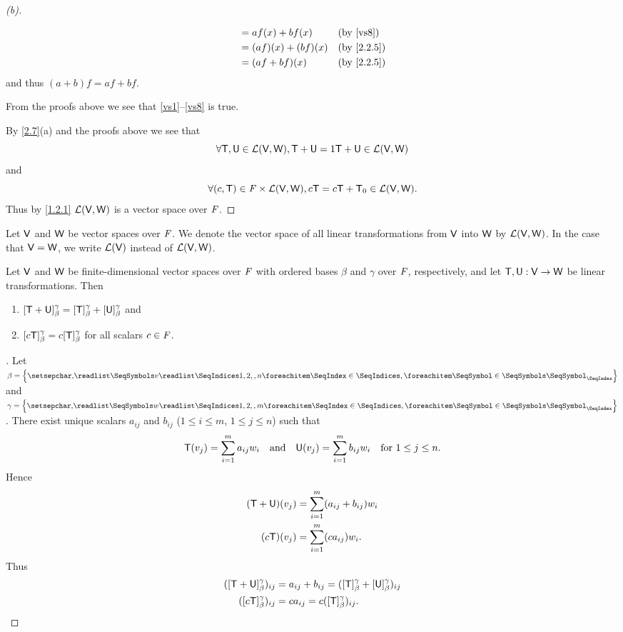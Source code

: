 \begin{proof}[(b)]
\begin{description}
\begin{align*}
                                        & = af(x) + bf(x)     &  & \text{(by \ref{vs8})}    \\
                                        & = (af)(x) + (bf)(x) &  & \text{(by \cref{2.2.5})} \\
                                        & = (af + bf)(x)      &  & \text{(by \cref{2.2.5})}
      \end{align*}
      and thus \((a + b)f = af + bf\).
  \end{description}
  From the proofs above we see that \ref{vs1}--\ref{vs8} is true.

  By \cref{2.7}(a) and the proofs above we see that
  \[
    \forall \mathsf{T}, \mathsf{U} \in \mathcal{L}(\mathsf{V}, \mathsf{W}), \mathsf{T} + \mathsf{U} = 1 \mathsf{T} + \mathsf{U} \in \mathcal{L}(\mathsf{V}, \mathsf{W})
  \]
  and
  \[
    \forall (c, \mathsf{T}) \in \mathit{F} \times \mathcal{L}(\mathsf{V}, \mathsf{W}), c \mathsf{T} = c \mathsf{T} + \mathsf{T}_0 \in \mathcal{L}(\mathsf{V}, \mathsf{W}).
  \]
  Thus by \cref{1.2.1} \(\mathcal{L}(\mathsf{V}, \mathsf{W})\) is a vector space over \(\mathit{F}\).
\end{proof}

\begin{defn}\label{2.2.6}
  Let \(\mathsf{V}\) and \(\mathsf{W}\) be vector spaces over \(\mathit{F}\).
  We denote the vector space of all linear transformations from \(\mathsf{V}\) into \(\mathsf{W}\) by \(\mathcal{L}(\mathsf{V}, \mathsf{W})\).
  In the case that \(\mathsf{V} = \mathsf{W}\), we write \(\mathcal{L}(\mathsf{V})\) instead of \(\mathcal{L}(\mathsf{V}, \mathsf{W})\).
\end{defn}

\begin{thm}\label{2.8}
  Let \(\mathsf{V}\) and \(\mathsf{W}\) be finite-dimensional vector spaces over \(\mathit{F}\) with ordered bases \(\beta\) and \(\gamma\) over \(\mathit{F}\), respectively, and let \(\mathsf{T}, \mathsf{U} : \mathsf{V} \to \mathsf{W}\) be linear transformations.
  Then
  \begin{enumerate}
    \item \([\mathsf{T} + \mathsf{U}]_{\beta}^{\gamma} = [\mathsf{T}]_{\beta}^{\gamma} + [\mathsf{U}]_{\beta}^{\gamma}\) and
    \item \([c \mathsf{T}]_{\beta}^{\gamma} = c [\mathsf{T}]_{\beta}^{\gamma}\) for all scalars \(c \in \mathit{F}\).
  \end{enumerate}
\end{thm}

\begin{proof}[]
  Let \(\beta = \set{\seq{v}{1,2,,n}}\) and \(\gamma = \set{\seq{w}{1,2,,m}}\).
  There exist unique scalars \(a_{i j}\) and \(b_{i j}\) (\(1 \leq i \leq m\), \(1 \leq j \leq n\)) such that
  \[
    \mathsf{T}(v_j) = \sum_{i = 1}^m a_{i j} w_i \quad \text{and} \quad \mathsf{U}(v_j) = \sum_{i = 1}^m b_{i j} w_i \quad \text{for } 1 \leq j \leq n.
  \]
  Hence
  \begin{align*}
    (\mathsf{T} + \mathsf{U})(v_j) & = \sum_{i = 1}^m (a_{i j} + b_{i j}) w_i \\
    (c \mathsf{T})(v_j)    & = \sum_{i = 1}^m (c a_{i j}) w_i.
  \end{align*}
  Thus
  \begin{align*}
    ([\mathsf{T} + \mathsf{U}]_{\beta}^{\gamma})_{i j} & = a_{i j} + b_{i j} = ([\mathsf{T}]_{\beta}^{\gamma} + [\mathsf{U}]_{\beta}^{\gamma})_{i j} \\
    ([c \mathsf{T}]_{\beta}^{\gamma})_{i j}    & = c a_{i j} = c ([\mathsf{T}]_{\beta}^{\gamma})_{i j}.
  \end{align*}
\end{proof}

